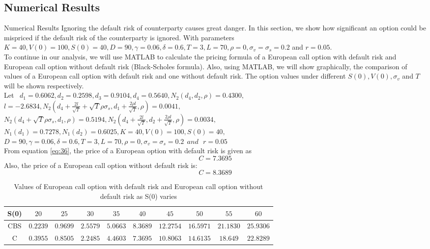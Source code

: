 \documentclass[pdf]{beamer}
\begin{document}
\subsection{Numerical Results}
\begin{frame}[allowframebreaks]{Numerical Results}
Ignoring the default risk of counterparty causes great danger. In this section, we show how significant an option could be mispriced if the default risk of the counterparty is ignored. With parameters $K= 40, V(0)= 100, S(0)= 40, D= 90, \gamma= 0.06, \delta= 0.6, T= 3, L= 70, \rho= 0, \sigma_{v}=\sigma_{s}= 0.2$ and $r= 0.05$.\\
	To continue in our analysis, we will use MATLAB to calculate the pricing formula of a European call option with default risk and European call option without default risk (Black-Scholes formula). Also, using MATLAB, we will show graphically, the comparison of values of a European call option with default risk and one without default risk. The option values under different $S(0), V(0), \sigma_{v}$ and $T$ will be shown respectively.\\
	Let ~$d_{1} = 0.6062, d_{2} = 0.2598, d_{3} = 0.9104, d_{4} = 0.5640, N_{2}( d_{4}, d_{2}, \rho)= 0. 4300,$\\
$l = -2.6834, N_{2}( d_{4} + \frac{2 l}{\sqrt{T}}+ \sqrt{T} \rho \sigma_{s}, d_{1} +  \frac{2 \rho l}{\sqrt{T}}, \rho)= 0.0041,$\\
$N_{2}( d_{4} + \sqrt{T} \rho \sigma_{s}, d_{1}, \rho)= 0.5194, N_{2}( d_{4} + \frac{2 l}{\sqrt{T}}, d_{2} +  \frac{2 \rho l}{\sqrt{T}}, \rho)= 0.0034,$ \\
$N_{1}(d_{1})= 0.7278,  N_{1}(d_{2})= 0.6025,   K= 40, V(0)= 100, S(0)= 40,$ \\
$D= 90, \gamma= 0.06, \delta= 0.6, T= 3, L= 70, \rho= 0, \sigma_{v}=\sigma_{s}= 0.2 ~~and~~~ r= 0.05$\\
From equation \eqref{eq:36}, the price of a European option with default risk is given as
\begin{equation}
\label{eq:50}
C = 7. 3695
\end{equation}
Also, the price of a European call option without default risk is:
\begin{equation}
\label{eq:51}
C = 8.3689
\end{equation}
\end{frame}
\begin{frame}[allowframebreaks]
\begin{table}
\small\addtolength{\tabcolsep}{-5pt}
\begin{tabular}{c|c|c|c|c|c|c|c|c|c}
S(0) & $20$ & $25$ & $30$ & $35$ & $40$ & $45$ & $50$ & $55$ & $60$\\
\hline 
CBS & $0.2239$ & $0.9699$ & $2.5579$ & $5.0663$ & $8.3689$ & $12.2754$ & $16.5971$ & $21.1830$ & $25.9306$\\
\hline
C & $0.3955$ & $0.8505$ & $2.2485$ & $4.4603$ & $7.3695$ & $10.8063$ & $14.6135$ & $18.649$ & $22.8289$\\
\end{tabular}
\caption{Values of European call option with default risk and European call option without default risk as S(0) varies}
\end{table}
\end{frame}
\end{document}
